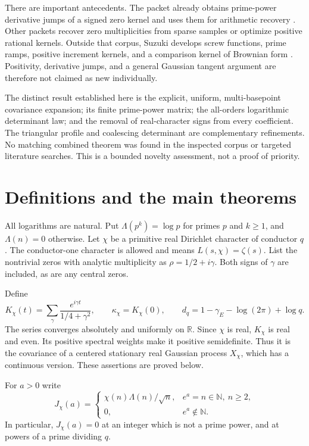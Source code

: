 \documentclass[11pt]{article}
\theoremstyle{definition}
\newcommand{\R}{\mathbb R}
\newcommand{\N}{\mathbb N}
\newcommand{\gE}{\gamma_{\!E}}
\newcommand{\kap}{\kappa}
\begin{document}
There are important antecedents. The packet
 already obtains prime-power
derivative jumps of a signed zero kernel and uses them for arithmetic recovery
\cite{cusp}. Other packets recover zero multiplicities from sparse samples or
optimize positive rational kernels. Outside that corpus, Suzuki develops
screw functions, prime ramps, positive increment kernels, and a comparison kernel
of Brownian form \cite{suzuki}. Positivity, derivative jumps, and a general
Gaussian tangent argument are therefore not claimed as new individually.

The distinct result established here is the explicit, uniform, multi-basepoint
covariance expansion; its finite prime-power matrix; the all-orders logarithmic
determinant law; and the removal of real-character signs from every coefficient.
The triangular profile and coalescing determinant are complementary refinements.
No matching combined theorem was found in the inspected corpus or targeted
literature searches. This is a bounded novelty assessment, not a proof of priority.

\section{Definitions and the main theorems}

All logarithms are natural. Put $\Lambda(p^k)=\log p$ for primes $p$ and $k\ge1$,
and $\Lambda(n)=0$ otherwise. Let $\chi$ be a primitive real Dirichlet character
of conductor $q$. The conductor-one character is allowed and means $L(s,\chi)=\zeta(s)$.
List the nontrivial zeros with analytic multiplicity as
$\rho=1/2+i\gamma$. Both signs of $\gamma$ are included, as are any central zeros.

Define
\begin{equation}\label{eq:kernel}
 K_\chi(t)=\sum_{\gamma}
 \frac{e^{i\gamma t}}{1/4+\gamma^2},\qquad
 \kap_\chi=K_\chi(0),\qquad
 d_q=1-\gE-\log(2\pi)+\log q.
\end{equation}
The series converges absolutely and uniformly on $\R$. Since $\chi$ is real,
$K_\chi$ is real and even. Its positive spectral weights make it positive
semidefinite. Thus it is the covariance of a centered stationary real Gaussian
process $X_\chi$, which has a continuous version. These assertions are proved below.

For $a>0$ write
\begin{equation}\label{eq:J}
 J_\chi(a)=
 \begin{cases}
  \chi(n)\Lambda(n)/\sqrt n,& e^a=n\in\N,\ n\ge2,\\
  0,& e^a\notin\N.
 \end{cases}
\end{equation}
In particular, $J_\chi(a)=0$ at an integer which is not a prime power, and at powers
of a prime dividing $q$.
\end{document}
